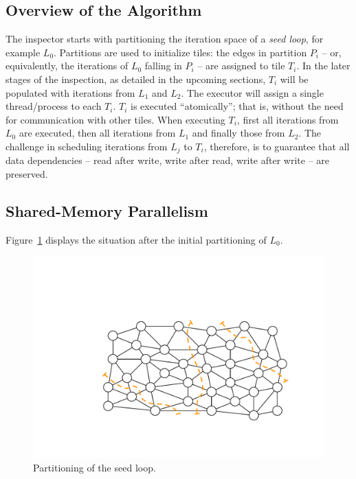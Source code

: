 \subsection{Overview of the Algorithm}
The inspector starts with partitioning the iteration space of a \textit{seed loop}, for example $L_0$. Partitions are used to initialize tiles: the edges in partition $P_i$ -- or, equivalently, the iterations of $L_0$ falling in $P_i$ -- are assigned to tile $T_i$. In the later stages of the inspection,  as detailed in the upcoming sections, $T_i$ will be populated with iterations from $L_1$ and $L_2$. The executor will assign a single thread/process to each $T_i$. $T_i$ is executed ``atomically''; that is, without the need for communication with other tiles. When executing $T_i$, first all iterations from $L_0$ are executed, then all iterations from $L_1$ and finally those from $L_2$. The challenge in scheduling iterations from $L_j$ to $T_i$, therefore, is to guarantee that all data dependencies -- read after write, write after read, write after write -- are preserved. 

\subsection{Shared-Memory Parallelism}
\label{sec:tiling:ex-sm}
Figure~\ref{fig:st-initial-part-sm} displays the situation after the initial partitioning of $L_0$. 

\begin{figure}[h]
\centering
\includegraphics[width=\textwidth]{sparsetiling/figures/partiotioned.pdf}
\caption{Partitioning of the seed loop.}
\label{fig:st-initial-part-sm}
\end{figure}

